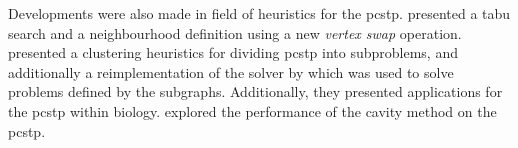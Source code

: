   Developments were also made in field of heuristics for the \gls{pcstp}. \citet{fu2014knowledge} presented a tabu search and a neighbourhood definition
  using a new \textit{vertex swap} operation.
  \citet{akhmedov2016divide} presented a clustering heuristics for dividing \gls{pcstp} into subproblems,
  and additionally a
  reimplementation of the solver by \citet{ljubic2005solving} which was used to solve problems defined by the subgraphs. Additionally, they presented
  applications for the \gls{pcstp} within biology.
  \citet{biazzo2012performance} explored the performance of the cavity method on the \gls{pcstp}.
  


\clearpage








